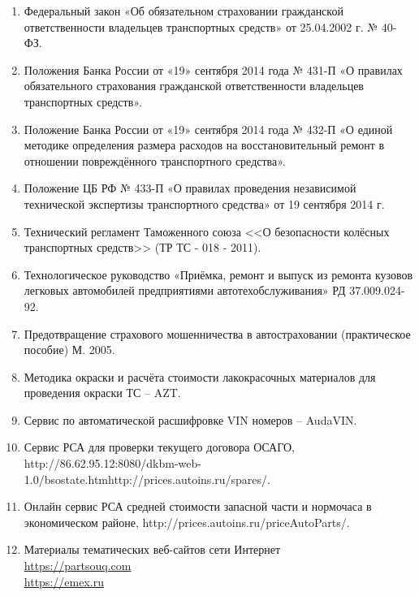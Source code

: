 \begin{enumerate}
\item   Федеральный закон «Об обязательном страховании гражданской ответственности владельцев транспортных средств» от 25.04.2002 г. № 40-ФЗ.
\item  Положения Банка России от «19» сентября 2014 года № 431-П «О правилах обязательного страхования гражданской ответственности владельцев транспортных средств».
\item  Положение Банка России от «19» сентября 2014 года № 432-П «О единой методике определения размера расходов на восстановительный ремонт в отношении повреждённого транспортного средства».
\item  Положение ЦБ РФ № 433-П «О правилах проведения независимой технической экспертизы транспортного средства» от 19 сентября 2014 г.
\item  Технический регламент Таможенного союза <<О безопасности колёсных транспортных средств>> (ТР ТС - 018 - 2011).
\item  Технологическое руководство «Приёмка, ремонт и выпуск из ремонта кузовов легковых автомобилей предприятиями автотехобслуживания» РД 37.009.024-92.
\item  Предотвращение страхового мошенничества в автостраховании  (практическое  пособие)  М.  2005.
\item  Методика окраски и расчёта стоимости лакокрасочных материалов для проведения окраски ТС – AZT. 
\item  Сервис по автоматической расшифровке VIN номеров – AudaVIN.
\item  Сервис РСА для проверки текущего договора ОСАГО,  http://86.62.95.12:8080/dkbm-web-1.0/bsostate.htmhttp://prices.autoins.ru/spares/.
\item  Онлайн сервис РСА средней стоимости запасной части и нормочаса в экономическом районе,    http://prices.autoins.ru/priceAutoParts/.
\item  	Материалы тематических веб-сайтов сети Интернет\\
\url{https://partsouq.com}\\
\url{https://emex.ru}
\end{enumerate}


